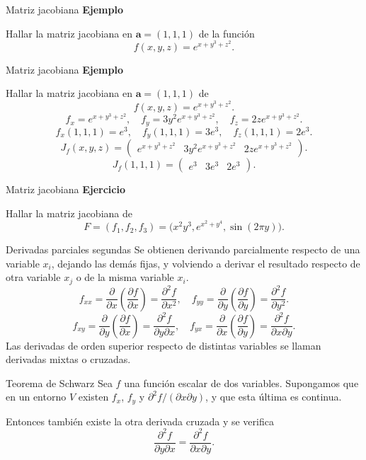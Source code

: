 \documentclass[original_version/main.tex]{subfiles}
\begin{document}
\begin{frame}{Matriz jacobiana}
\textbf{Ejemplo}\par Hallar la matriz jacobiana en $\mathbf a=(1,1,1)$ de la función\[f(x,y,z)=e^{x+y^3+z^2}.\]
\end{frame}
\begin{frame}{Matriz jacobiana}
\small\textbf{Ejemplo}\par Hallar la matriz jacobiana en $\mathbf a=(1,1,1)$ de
\[f(x,y,z)=e^{x+y^3+z^2}.\]
\[f_x=e^{x+y^3+z^2},\quad f_y=3y^2e^{x+y^3+z^2},\quad f_z=2ze^{x+y^3+z^2}.\]
\[f_x(1,1,1)=e^3,\quad f_y(1,1,1)=3e^3,\quad f_z(1,1,1)=2e^3.\]
\[J_f(x,y,z)=\begin{pmatrix}e^{x+y^3+z^2}&3y^2e^{x+y^3+z^2}&2ze^{x+y^3+z^2}\end{pmatrix}.\]
\[J_f(1,1,1)=\begin{pmatrix}e^3&3e^3&2e^3\end{pmatrix}.\]
\end{frame}
\begin{frame}{Matriz jacobiana}
\textbf{Ejercicio}\par Hallar la matriz jacobiana de
\[F=(f_1,f_2,f_3)=\bigl(x^2y^3,e^{x^2+y^4},\sin(2\pi y)\bigr).\]
\end{frame}
\begin{frame}{Derivadas parciales segundas}
\small Se obtienen derivando parcialmente respecto de una variable $x_i$, dejando las demás fijas, y volviendo a derivar el resultado respecto de otra variable $x_j$ o de la misma variable $x_i$.
\[f_{xx}=\frac{\partial}{\partial x}\left(\frac{\partial f}{\partial x}\right)=\frac{\partial^2f}{\partial x^2},\quad
f_{yy}=\frac{\partial}{\partial y}\left(\frac{\partial f}{\partial y}\right)=\frac{\partial^2f}{\partial y^2}.\]
\[f_{xy}=\frac{\partial}{\partial y}\left(\frac{\partial f}{\partial x}\right)=\frac{\partial^2f}{\partial y\partial x},\quad
f_{yx}=\frac{\partial}{\partial x}\left(\frac{\partial f}{\partial y}\right)=\frac{\partial^2f}{\partial x\partial y}.\]
Las derivadas de orden superior respecto de distintas variables se llaman derivadas mixtas o cruzadas.
\end{frame}
\begin{frame}{Teorema de Schwarz}
Sea $f$ una función escalar de dos variables. Supongamos que en un entorno $V$ existen $f_x$, $f_y$ y $\partial^2f/(\partial x\partial y)$, y que esta última es continua.
\medskip

Entonces también existe la otra derivada cruzada y se verifica
\[\frac{\partial^2f}{\partial y\partial x}=\frac{\partial^2f}{\partial x\partial y}.\]
\end{frame}
\end{document}
